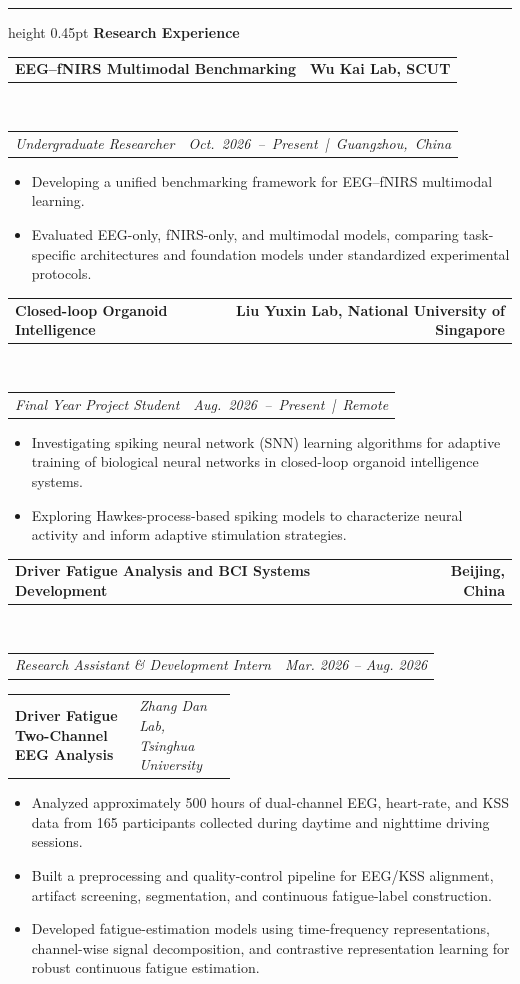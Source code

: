 \documentclass[11pt,a4paper]{article}
\makeatletter
\newcommand{\researchentry}[5]{%
  \begin{tabularx}{\linewidth}{@{}
    >{\raggedright\arraybackslash\hyphenpenalty=10000\exhyphenpenalty=10000}X
    r@{}}
    \textbf{#1} & \textbf{#2}
  \end{tabularx}\\[1pt]
  \begin{tabularx}{\linewidth}{@{}Xr@{}}
    \textit{#3} & \textit{\mbox{#4 \;|\; #5}}
  \end{tabularx}
}
\newcommand{\internshipentry}[4]{%
  \begin{tabularx}{\linewidth}{@{}Xr@{}}
    \textbf{#1} & \textbf{#4}
  \end{tabularx}\\[1pt]
  \begin{tabularx}{\linewidth}{@{}Xr@{}}
    \textit{#2} & \textit{#3}
  \end{tabularx}
}
\newcommand{\projectorgtitle}[2]{%
  \vspace{3pt}
  \begin{tabularx}{\linewidth}{@{}
    >{\raggedright\arraybackslash}X
    >{\raggedleft\arraybackslash}p{0.44\linewidth}@{}}
    \textbf{#1} & {\small\itshape #2}
  \end{tabularx}\par
  \vspace{1pt}
}
\newcommand{\cvsection}[1]{%
  \vspace{12pt}
  \hrule height 0.45pt
  \vspace{12pt}
  {\large\bfseries #1}\par
  \vspace{6pt}
}
\makeatother
\begin{document}
\cvsection{Research Experience}

\researchentry
{EEG--fNIRS Multimodal Benchmarking}
{Wu Kai Lab, SCUT}
{Undergraduate Researcher}
{Oct. 2026 -- Present}
{Guangzhou, China}

\begin{itemize}
  \item Developing a unified benchmarking framework for EEG--fNIRS multimodal learning.
  \item Evaluated EEG-only, fNIRS-only, and multimodal models, comparing task-specific architectures and foundation models under standardized experimental protocols.
\end{itemize}

\vspace{1\baselineskip}

\researchentry
{Closed-loop Organoid Intelligence}
{Liu Yuxin Lab, National University of Singapore}
{Final Year Project Student}
{Aug. 2026 -- Present}
{Remote}

\begin{itemize}
  \item Investigating spiking neural network (SNN) learning algorithms
  for adaptive training of biological neural networks in closed-loop
  organoid intelligence systems.
  \item Exploring Hawkes-process-based spiking models to characterize
  neural activity and inform adaptive stimulation strategies.
\end{itemize}

\newpage

\internshipentry
{Driver Fatigue Analysis and BCI Systems Development}
{Research Assistant \& Development Intern}
{Mar. 2026 -- Aug. 2026}
{Beijing, China}

\projectorgtitle
{Driver Fatigue Two-Channel EEG Analysis}
{Zhang Dan Lab, Tsinghua University}
\begin{itemize}
  \item Analyzed approximately 500 hours of dual-channel EEG,
  heart-rate, and KSS data from 165 participants collected during
  daytime and nighttime driving sessions.
  \item Built a preprocessing and quality-control pipeline for
  EEG/KSS alignment, artifact screening, segmentation, and continuous
  fatigue-label construction.
  \item Developed fatigue-estimation models using time-frequency
  representations, channel-wise signal decomposition, and contrastive
  representation learning for robust continuous fatigue estimation.
\end{itemize}
\end{document}

